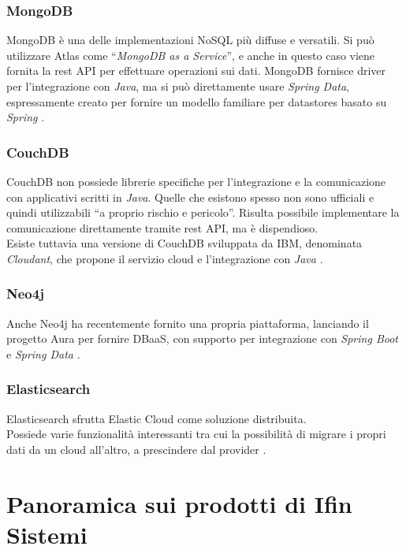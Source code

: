 \subsubsection{MongoDB}
MongoDB è una delle implementazioni NoSQL più diffuse e versatili. Si può utilizzare Atlas come ``\textit{MongoDB as a Service}'', e anche in questo caso viene fornita la \gls{rest API} per effettuare operazioni sui dati. MongoDB fornisce driver per l'integrazione con \textit{Java}, ma si può direttamente usare \textit{Spring Data}, espressamente creato per fornire un modello familiare per datastores basato su \textit{Spring} \cite{site:udemymongodb}.

\subsubsection{CouchDB}
CouchDB non possiede librerie specifiche per l'integrazione e la comunicazione con applicativi scritti in \textit{Java}. Quelle che esistono spesso non sono ufficiali e quindi utilizzabili ``a proprio rischio e pericolo''. Risulta possibile implementare la comunicazione direttamente tramite \gls{rest API}, ma è dispendioso.\\
Esiste tuttavia una versione di CouchDB sviluppata da IBM, denominata \textit{Cloudant}, che propone il servizio cloud e l'integrazione con \textit{Java} \cite{site:udemycouchdb}.

\subsubsection{Neo4j}
Anche Neo4j ha recentemente fornito una propria piattaforma, lanciando il progetto Aura per fornire \gls{DBaaS}, con supporto per integrazione con \textit{Spring Boot} e \textit{Spring Data} \cite{site:udemyneo4j}.

\subsubsection{Elasticsearch}
Elasticsearch sfrutta Elastic Cloud come soluzione distribuita.\\
Possiede varie funzionalità interessanti tra cui la possibilità di migrare i propri dati da un cloud all'altro, a prescindere dal provider \cite{site:udemyelasticsearch}.


\section{Panoramica sui prodotti di Ifin Sistemi}


